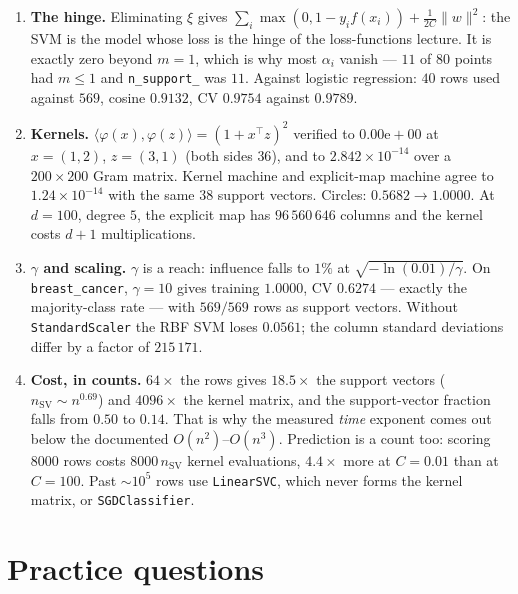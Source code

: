 \documentclass[11pt]{article}
\begin{document}
\begin{enumerate}[leftmargin=*]
    puts $1/(2C)$ on $\|w\|^2$, so $\lambda = 1/C$. Measured: $\|w\|$ climbed
    $0.3555 \to 20.8998$ as $C$ went $0.001 \to 100$, and cross-validated
    accuracy peaked at $\mathbf{0.9772}$ in the middle, at $C = 0.1$.
  \item \textbf{The hinge.} Eliminating $\xi$ gives
    $\sum_i \max(0, 1 - y_i f(x_i)) + \frac{1}{2C}\|w\|^2$: the SVM is the
    model whose loss is the hinge of the loss-functions lecture. It is exactly
    zero beyond $m = 1$, which is why most $\alpha_i$ vanish --- $11$ of $80$
    points had $m \le 1$ and \texttt{n\_support\_} was $11$. Against logistic
    regression: $40$ rows used against $569$, cosine $0.9132$, CV $0.9754$
    against $0.9789$.
  \item \textbf{Kernels.}
    $\langle\varphi(x),\varphi(z)\rangle = (1 + x^\top z)^2$ verified to
    $0.00\mathrm{e}{+}00$ at $x = (1,2)$, $z = (3,1)$ (both sides $36$), and to
    $2.842\times10^{-14}$ over a $200\times200$ Gram matrix. Kernel machine and
    explicit-map machine agree to $1.24\times10^{-14}$ with the same $38$
    support vectors. Circles: $0.5682 \to \mathbf{1.0000}$. At $d = 100$,
    degree $5$, the explicit map has $96\,560\,646$ columns and the kernel
    costs $d+1$ multiplications.
  \item \textbf{$\gamma$ and scaling.} $\gamma$ is a reach: influence falls to
    $1\%$ at $\sqrt{-\ln(0.01)/\gamma}$. On \texttt{breast\_cancer},
    $\gamma = 10$ gives training $1.0000$, CV $\mathbf{0.6274}$ --- exactly the
    majority-class rate --- with $569/569$ rows as support vectors. Without
    \texttt{StandardScaler} the RBF SVM loses $\mathbf{0.0561}$; the column
    standard deviations differ by a factor of $215\,171$.
  \item \textbf{Cost, in counts.} $64\times$ the rows gives $18.5\times$ the
    support vectors ($n_{\mathrm{SV}} \sim n^{0.69}$) and $4096\times$ the
    kernel matrix, and the support-vector fraction falls from $0.50$ to
    $0.14$. That is why the measured \emph{time} exponent comes out below the
    documented $O(n^2)$--$O(n^3)$. Prediction is a count too: scoring $8000$
    rows costs $8000\,n_{\mathrm{SV}}$ kernel evaluations, $4.4\times$ more
    at $C = 0.01$ than at $C = 100$. Past $\sim 10^5$ rows use
    \texttt{LinearSVC}, which never forms the kernel matrix, or
    \texttt{SGDClassifier}.
\end{enumerate}

\section{Practice questions}
\label{sec:questions}
\end{document}
